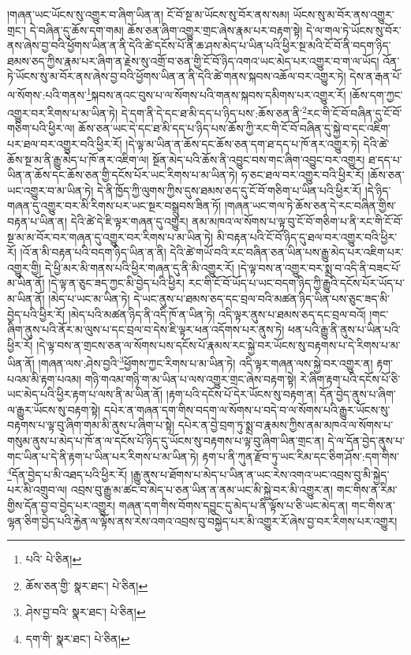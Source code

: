 །གཞན་ཡང་ཡོངས་སུ་འགྱུར་བ་ཞིག་ཡིན་ན། ངོ་བོ་སྔ་མ་ཡོངས་སུ་བོར་ནས་སམ། ཡོངས་སུ་མ་བོར་ནས་འགྱུར་གྲང་། དེ་བཞིན་དུ་ཆོས་དག་གམ། ཆོས་ཅན་ཞིག་འགྱུར་གྲང་ཞེས་རྣམ་པར་བརྟག་སྟེ། དེ་ལ་གལ་ཏེ་ཡོངས་སུ་བོར་ནས་ཞེས་བྱ་བའི་ཕྱོགས་ཡིན་ན་ནི་དེའི་ཚེ་དངོས་པོ་ནི་ཆ་ཤས་མེད་པ་ཡིན་པའི་ཕྱིར་སྔ་མའི་ངོ་བོ་ནི་བདག་ཉིད་ཐམས་ཅད་ཀྱིས་རྣམ་པར་ཞིག་ན་རྗེས་སུ་འགྲོ་བ་ཅན་གྱི་ངོ་བོ་ཉིད་འགའ་ཡང་མེད་པར་འགྱུར་བ་ག་ལ་ཡོད། འོན་ཏེ་ཡོངས་སུ་མ་བོར་ནས་ཞེས་བྱ་བའི་ཕྱོགས་ཡིན་ན་ནི་དེའི་ཚེ་གནས་སྐབས་འཆོལ་བར་འགྱུར་ཏེ། དེས་ན་རྒན་པོ་ལ་སོགས་:པའི་གནས་\footnote{པའི་  པེ་ཅིན། }སྐབས་ནའང་བུས་པ་ལ་སོགས་པའི་གནས་སྐབས་དམིགས་པར་འགྱུར་རོ། །ཆོས་དག་ཀྱང་འགྱུར་བར་རིགས་པ་མ་ཡིན་ཏེ། དེ་དག་ནི་དེ་དང་ཐ་མི་དད་པ་ཉིད་པས་:ཆོས་ཅན་ནི་\footnote{ཆོས་ཅན་གྱི་  སྣར་ཐང་།  པེ་ཅིན། }རང་གི་ངོ་བོ་བཞིན་དུ་ངོ་བོ་གཅིག་པའི་ཕྱིར་ལ། ཆོས་ཅན་ཡང་དེ་དང་ཐ་མི་དད་པ་ཉིད་པས་ཆོས་ཀྱི་རང་གི་ངོ་བོ་བཞིན་དུ་སྐྱེ་བ་དང་འཇིག་པར་ཐལ་བར་འགྱུར་བའི་ཕྱིར་རོ། །དེ་ལྟ་མ་ཡིན་ན་ཆོས་དང་ཆོས་ཅན་དག་ཐ་དད་པ་ཁོ་ནར་འགྱུར་ཏེ། དེའི་ཚེ་ཆོས་སྔ་མ་ནི་རྒྱུ་མེད་པ་ཁོ་ནར་འཇིག་ལ། སྔོན་མེད་པའི་ཆོས་ནི་འབྱུང་བས་གང་ཞིག་འབྱུང་བར་འགྱུར། ཐ་དད་པ་ཡིན་ན་ཆོས་དང་ཆོས་ཅན་གྱི་དངོས་པོར་ཡང་རིགས་པ་མ་ཡིན་ཏེ། ཧ་ཅང་ཐལ་བར་འགྱུར་བའི་ཕྱིར་རོ། །ཆོས་ཅན་ཡང་འགྱུར་བ་མ་ཡིན་ཏེ། དེ་ནི་ཁྱོད་ཀྱི་ལུགས་ཀྱིས་དུས་ཐམས་ཅད་དུ་ངོ་བོ་གཅིག་པ་ཡིན་པའི་ཕྱིར་རོ། །དེ་ཉིད་གཞན་དུ་འགྱུར་བར་མི་རིགས་པར་ཡང་སྔར་བསྒྲུབས་ཟིན་ཏོ། །གཞན་ཡང་གལ་ཏེ་ཆོས་ཅན་དེ་རང་བཞིན་གྱིས་བརྟན་པ་ཡིན་ན། དེའི་ཚེ་དེ་ཇི་ལྟར་གཞན་དུ་འགྱུར། ནམ་མཁའ་ལ་སོགས་པ་ལྟ་བུ་ངོ་བོ་གཅིག་པ་ནི་རང་གི་ངོ་བོ་སྔ་མ་མ་བོར་བར་གཞན་དུ་འགྱུར་བར་རིགས་པ་མ་ཡིན་ཏེ། མི་བརྟན་པའི་ངོ་བོ་ཉིད་དུ་ཐལ་བར་འགྱུར་བའི་ཕྱིར་རོ། །འོ་ན་མི་བརྟན་པའི་བདག་ཉིད་ཡིན་ན་ནི། དེའི་ཚེ་གཡོ་བའི་རང་བཞིན་ཅན་ཡིན་པས་རྒྱུ་མེད་པར་འཇིག་པར་འགྱུར་གྱི། དེ་ཕྱི་མར་མི་གནས་པའི་ཕྱིར་གཞན་དུ་ནི་མི་འགྱུར་རོ། །དེ་ལྟ་བས་ན་འགྱུར་བར་སྨྲ་བ་འདི་ནི་བཟང་པོ་མ་ཡིན་ནོ། །དེ་ལྟ་ན་ཅུང་ཟད་ཀྱང་མི་བྱེད་པའི་ཕྱིར། རང་གི་ངོ་བོ་ཡོད་པ་ཡང་བདག་ཉིད་ཀྱི་རྒྱུའི་དངོས་པོར་ཡོད་པ་མ་ཡིན་ནོ། །མེད་པ་ཡང་མ་ཡིན་ཏེ། དེ་ཡང་ནུས་པ་ཐམས་ཅད་དང་བྲལ་བའི་མཚན་ཉིད་ཡིན་པས་ཅུང་ཟད་མི་བྱེད་པའི་ཕྱིར་རོ། །མེད་པའི་མཚན་ཉིད་ནི་འདི་ཁོ་ན་ཡིན་ཏེ། འདི་ལྟར་ནུས་པ་ཐམས་ཅད་དང་བྲལ་བའོ། །གང་ཞིག་ནུས་པའི་ནོར་མ་ལུས་པ་དང་བྲལ་བ་དེས་ཇི་ལྟར་ཕན་འདོགས་པར་ནུས་ཏེ། ཕན་པའི་རྒྱུ་ནི་ནུས་པ་ཡིན་པའི་ཕྱིར་རོ། །དེ་ལྟ་བས་ན་གྲངས་ཅན་ལ་སོགས་པས་དངོས་པོ་རྣམས་རང་སྐྱེ་བར་ཡོངས་སུ་བརྟགས་པ་དེ་རིགས་པ་མ་ཡིན་ནོ། །གཞན་ལས་:ཤེས་བྱའི་\footnote{ཤེས་བྱ་བའི་  སྣར་ཐང་།  པེ་ཅིན། }ཕྱོགས་ཀྱང་རིགས་པ་མ་ཡིན་ཏེ། འདི་ལྟར་གཞན་ལས་སྐྱེ་བར་འགྱུར་ན། རྟག་པའམ་མི་རྟག་པའམ། གཉི་གའམ་གཉི་ག་མ་ཡིན་པ་ལས་འགྱུར་གྲང་ཞེས་བརྟག་སྟེ། རེ་ཞིག་རྟག་པའི་དངོས་པོ་ཅི་ཡང་མེད་པའི་ཕྱིར་རྟག་པ་ལས་ནི་མ་ཡིན་ནོ། །རྟག་པའི་དངོས་པོ་དེར་ཡོངས་སུ་བརྟག་ན། དོན་བྱེད་ནུས་པ་ཞིག་ལ་རྒྱུར་ཡོངས་སུ་བརྟག་སྟེ། དཔེར་ན་གཞན་དག་གིས་བདག་ལ་སོགས་པ་བདེ་བ་ལ་སོགས་པའི་རྒྱུར་ཡོངས་སུ་བརྟགས་པ་ལྟ་བུ་ཞིག་གམ་མི་ནུས་པ་ཞིག་པ་སྟེ། དཔེར་ན་བྱེ་བྲག་ཏུ་སྨྲ་བ་རྣམས་ཀྱིས་ནམ་མཁའ་ལ་སོགས་པ་གསུམ་ནུས་པ་མེད་པ་ཁོ་ན་ལ་དངོས་པོ་ཉིད་དུ་ཡོངས་སུ་བརྟགས་པ་ལྟ་བུ་ཞིག་ཡིན་གྲང་ན། དེ་ལ་དོན་བྱེད་ནུས་པ་གང་ཡིན་པ་དེ་ནི་རྟག་པ་ཡིན་པར་རིགས་པ་མ་ཡིན་ཏེ། རྟག་པ་ནི་ཀུན་རྫོབ་ཏུ་ཡང་རིམ་དང་ཅིག་ཤོས་:དག་གིས་\footnote{དག་གི་  སྣར་ཐང་།  པེ་ཅིན། }དོན་བྱེད་པ་མི་འཐད་པའི་ཕྱིར་རོ། །རྒྱུ་ནུས་པ་ཐོགས་པ་མེད་པ་ཡིན་ན་ཡང་རེས་འགའ་ཡང་འབྲས་བུ་མི་སྐྱེད་པར་མི་འགྲུབ་ལ། འབྲས་བུ་རྒྱུ་མ་ཚང་བ་མེད་པ་ཅན་ཡིན་ན་ནམ་ཡང་མི་སྐྱེ་བར་མི་འགྱུར་ན། གང་གིས་ན་རིམ་གྱིས་དོན་བྱ་བ་བྱེད་པར་འགྱུར། གཞན་དག་གིས་བོགས་དབྱུང་དུ་མེད་པ་ནི་ལྟོས་པ་ཅི་ཡང་མེད་ན། གང་གིས་ན་ལྷན་ཅིག་བྱེད་པའི་རྐྱེན་ལ་ལྟོས་ནས་རེས་འགའ་འབྲས་བུ་བསྐྱེད་པར་མི་འགྱུར་རོ་ཞེས་བྱ་བར་རིགས་པར་འགྱུར། 